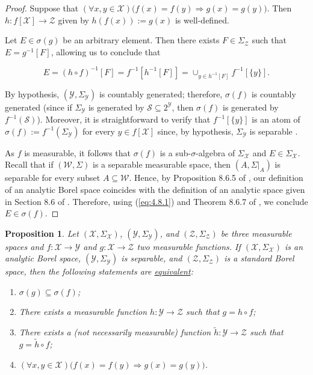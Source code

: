 \documentclass[12pt]{article}
\newtheorem{proposition}{Proposition}[section]
\begin{document}
\begin{proof}
Suppose that $(\forall x,y\in \mathcal{X})\big(f(x)=f(y)\Rightarrow g(x)=g(y)\big)$. Then $h:f[\mathcal{X}]\to \mathcal{Z}$ given by $h(f(x)):=g(x)$ is well-defined.

	Let $E\in \sigma (g)$ be an arbitrary element. Then there exists $F\in \Sigma _\mathcal{Z}$ such that $E=g^{-1}[F]$, allowing us to conclude that 

\begin{equation}
\label{eq:4.8.1}
E=(h\circ f)^{-1}[F]=f^{-1}[h^{-1}[F]]=\cup _{y\in h^{-1}[F]}f^{-1}[\{y\}].
\end{equation}

	By hypothesis, $(\mathcal{Y},\Sigma _\mathcal{Y})$ is countably generated; therefore, $\sigma (f)$ is countably generated (since if $\Sigma _\mathcal{Y}$ is generated by $\mathcal{S}\subseteq 2^\mathcal{Y}$, then $\sigma (f)$ is generated by $f^{-1}(\mathcal{S})$). Moreover, it is straightforward to verify that $f^{-1}[\{y\}]$ is an atom of $\sigma (f):=f^{-1}(\Sigma _\mathcal{Y})$ for every $y\in f[\mathcal{X}]$ since, by hypothesis, $\Sigma _\mathcal{Y}$ is separable \citep[see Section 8.6 of][for the definition of an atom]{Cohn2013}.

	As $f$ is measurable, it follows that $\sigma (f)$ is a sub-$\sigma$-algebra of $\Sigma _\mathcal{X}$ and $E\in \Sigma _\mathcal{X}$. Recall that if $(\mathcal{W},\Sigma )$ is a separable measurable space, then $(A,\Sigma |_A)$ is separable for every subset $A\subseteq\mathcal{W}$. 
    Hence, by Proposition 8.6.5 of \cite{Cohn2013}, our definition of an analytic Borel space coincides with the definition of an analytic space given in Section 8.6 of \cite{Cohn2013}. Therefore, using (\ref{eq:4.8.1}) and Theorem 8.6.7 of \cite{Cohn2013}, we conclude $E\in \sigma (f)$.
\end{proof}

\begin{proposition}
\label{prop:4.9}
Let $(\mathcal{X},\Sigma _\mathcal{X})$, $(\mathcal{Y},\Sigma _\mathcal{Y})$, and $(\mathcal{Z},\Sigma _\mathcal{Z})$ be three measurable spaces and $f:\mathcal{X}\to \mathcal{Y}$ and $g:\mathcal{X}\to \mathcal{Z}$ two measurable functions. If $(\mathcal{X},\Sigma _\mathcal{X})$ is an analytic Borel space, $(\mathcal{Y},\Sigma _\mathcal{Y})$ is separable, and $(\mathcal{Z},\Sigma _\mathcal{Z})$ is a standard Borel space, then the following statements are \underline{equivalent}:
    \begin{enumerate}
        \item $\sigma (g)\subseteq \sigma (f)$;
        \item There exists a measurable function $h:\mathcal{Y}\to \mathcal{Z}$ such that $g=h\circ f$;
        \item There exists a (not necessarily measurable) function $\tilde h:\mathcal{Y}\to \mathcal{Z}$ such that $g=\tilde h\circ f$;
        \item $(\forall x,y\in \mathcal{X})\big(f(x)=f(y)\Rightarrow g(x)=g(y)\big)$.
    \end{enumerate}
\end{proposition}
\end{document}

